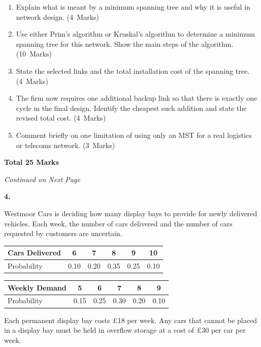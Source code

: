 \documentclass[11pt,a4paper]{article}
\newcommand{\continuednotice}{%
    \vfill
    \begin{center}
    \textit{Continued on Next Page}
    \end{center}
    \newpage
}
\newcommand{\markalloc}[1]{\nobreak\hfill\mbox{(#1 Marks)}}
\newcommand{\questiontotal}[1]{\begin{flushright}\textbf{Total #1 Marks}\end{flushright}}
\begin{document}
\begin{enumerate}
\item Explain what is meant by a minimum spanning tree and why it is useful in network design. \markalloc{4}

\item Use either Prim's algorithm or Kruskal's algorithm to determine a minimum spanning tree for this network. Show the main steps of the algorithm. \markalloc{10}

\item State the selected links and the total installation cost of the spanning tree. \markalloc{4}

\item The firm now requires one additional backup link so that there is exactly one cycle in the final design. Identify the cheapest such addition and state the revised total cost. \markalloc{4}

\item Comment briefly on one limitation of using only an MST for a real logistics or telecoms network. \markalloc{3}
\end{enumerate}

\questiontotal{25}

\continuednotice

\textbf{4.}

Westmoor Cars is deciding how many display bays to provide for newly delivered vehicles.
Each week, the number of cars delivered and the number of cars requested by customers are uncertain.

\begin{center}
\begin{tabular}{lccccc}
\toprule
Cars Delivered & 6 & 7 & 8 & 9 & 10 \\
\midrule
Probability & 0.10 & 0.20 & 0.35 & 0.25 & 0.10 \\
\bottomrule
\end{tabular}
\end{center}

\begin{center}
\begin{tabular}{lccccc}
\toprule
Weekly Demand & 5 & 6 & 7 & 8 & 9 \\
\midrule
Probability & 0.15 & 0.25 & 0.30 & 0.20 & 0.10 \\
\bottomrule
\end{tabular}
\end{center}

Each permanent display bay costs \pounds18 per week.
Any cars that cannot be placed in a display bay must be held in overflow storage at a cost of \pounds30 per car per week.
\end{document}
